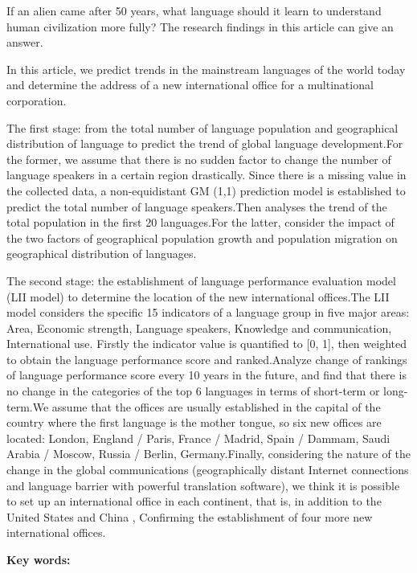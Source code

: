 \noindent If an alien came after 50 years, what language should it learn to understand human civilization more fully? The research findings in this article can give an answer.
\par In this article, we predict trends in the mainstream languages of the world today and determine the address of a new international office for a multinational corporation.
\par The first stage: from the total number of language population and geographical distribution of language to predict the trend of global language development.For the former, we assume that there is no sudden factor to change the number of language speakers in a certain region drastically. Since there is a missing value in the collected data, a non-equidistant GM (1,1) prediction model is established to predict the total number of language speakers.Then analyses the trend of the total population in the first 20 languages.For the latter, consider the impact of the two factors of geographical population growth and population migration on geographical distribution of languages. 
\par The second stage: the establishment of language performance evaluation model (LII model) to determine the location of the new international offices.The LII model considers the specific 15 indicators of a language group in five major areas: Area, Economic strength, Language speakers, Knowledge and communication, International use. Firstly the indicator value is quantified to [0, 1], then weighted to obtain the language performance score and ranked.Analyze change of rankings of language performance score every 10 years in the future, and find that there is no change in the categories of the top 6 languages in terms of short-term or long-term.We assume that the offices are usually established in the capital of the country where the first language is the mother tongue, so six new offices are located: London, England / Paris, France / Madrid, Spain / Dammam, Saudi Arabia / Moscow, Russia / Berlin, Germany.Finally, considering the nature of the change in the global communications (geographically distant Internet connections and language barrier with powerful translation software), we think it is possible to set up an international office in each continent, that is, in addition to the United States and China , Confirming the establishment of four more new international offices. 




\par
\noindent
\textbf{Key words:}
